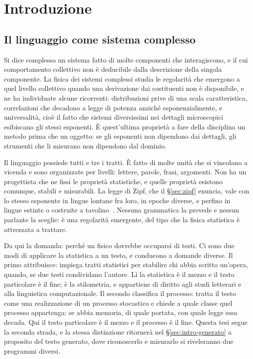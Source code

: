 
\chapter{Introduzione}
\label{cap:introduzione}

\section{Il linguaggio come sistema complesso}
\label{sec:intro-complessi}

Si dice complesso un sistema fatto di molte componenti che interagiscono, e il
cui comportamento collettivo non è deducibile dalla descrizione della singola
componente. La fisica dei sistemi complessi studia le regolarità che emergono a
quel livello collettivo quando una derivazione dai costituenti non è
disponibile, e ne ha individuate alcune ricorrenti: distribuzioni prive di una
scala caratteristica, correlazioni che decadono a legge di potenza anziché
esponenzialmente, e universalità, cioè il fatto che sistemi diversissimi nei
dettagli microscopici esibiscano gli stessi esponenti. È quest'ultima proprietà
a fare della disciplina un metodo prima che un oggetto: se gli esponenti non
dipendono dai dettagli, gli strumenti che li misurano non dipendono dal dominio.

Il linguaggio possiede tutti e tre i tratti. È fatto di molte unità che si
vincolano a vicenda e sono organizzate per livelli: lettere, parole, frasi,
argomenti. Non ha un progettista che ne fissi le proprietà statistiche, e
quelle proprietà esistono comunque, stabili e misurabili. La legge di Zipf,
che il §\ref{sec:zipf} enuncia, vale con lo stesso esponente in lingue lontane
fra loro, in epoche diverse, e perfino in lingue estinte o costruite a
tavolino~\cite{piantadosi2014}. Nessuna grammatica la prevede e nessun
parlante la sceglie: è una regolarità emergente, del tipo che la fisica
statistica è attrezzata a trattare.

Da qui la domanda: perché un fisico dovrebbe occuparsi di testi. Ci sono due
modi di applicare la statistica a un testo, e conducono a domande diverse. Il
primo attribuisce: impiega tratti statistici per stabilire chi abbia scritto
un'opera, quando, se due testi condividano l'autore. Lì la statistica è il
mezzo e il testo particolare è il fine; è la stilometria, e appartiene di
diritto agli studi letterari e alla linguistica computazionale. Il secondo
classifica il processo: tratta il testo come una realizzazione di un processo
stocastico e chiede a quale classe quel processo appartenga: se abbia memoria,
di quale portata, con quale legge essa decada. Qui il testo particolare è il
mezzo e il processo è il fine. Questa tesi segue la seconda strada, e la
stessa distinzione ritornerà nel §\ref{sec:intro-generato} a proposito del
testo generato, dove riconoscerlo e misurarlo si riveleranno due programmi
diversi.


